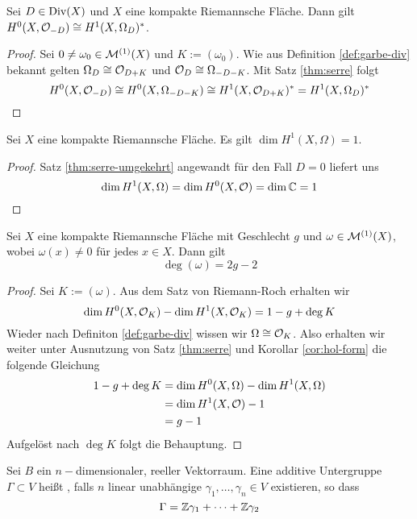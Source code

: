 \begin{thm}
  \label{thm:serre-umgekehrt}
  Sei $D \in \operatorname{Div}(X)$ und $X$ eine kompakte Riemannsche Fläche. Dann
  gilt $H^0(X, \mathcal{O}_{-D}) \cong H^1(X, \Omega_D)^\ast$.
\end{thm}

\begin{proof}
  Sei $0 \neq \omega_0 \in \mathcal{M}^{(1)}(X)$ und $K := (\omega_0)$. Wie
  aus Definition \ref{def:garbe-div} bekannt gelten $\Omega_D \cong
  \mathcal{O}_{D+K}$ und $\mathcal{O}_D \cong \Omega_{-D-K}$. Mit Satz
  \ref{thm:serre} folgt
  \[
  H^0(X, \mathcal{O}_{-D}) \cong H^0(X, \Omega_{-D-K}) \cong H^1(X,
  \mathcal{O}_{D+K})^\ast = H^1(X, \Omega_D)^\ast
  \]
\end{proof}

\begin{cor}
  \label{cor:hol-form}
  Sei $X$ eine kompakte Riemannsche Fläche. Es gilt $\dim H^1(X,
  \Omega) = 1$.
\end{cor}

\begin{proof}
  Satz \ref{thm:serre-umgekehrt} angewandt für den Fall $D = 0$
  liefert uns
  \[
  \dim H^1(X, \Omega) = \dim H^0(X, \mathcal{O}) = \dim \mathbb{C} = 1
  \]
\end{proof}

\begin{thm}
  \label{thm:deg-geschlecht}
  Sei $X$ eine kompakte Riemannsche Fläche mit Geschlecht $g$ und $\omega
  \in \mathcal{M}^{(1)}(X)$, wobei $\omega(x) \neq 0$ für jedes $x \in
  X$. Dann gilt
  \[
  \deg(\omega) = 2g - 2
  \]
\end{thm}

\begin{proof}
  Sei $K := (\omega)$. Aus dem Satz von Riemann-Roch erhalten wir
  \[
  \dim H^0(X, \mathcal{O}_K) - \dim H^1(X, \mathcal{O}_K) = 1 - g + \deg K
  \]
  Wieder nach Definiton \ref{def:garbe-div} wissen wir $\Omega \cong
  \mathcal{O}_K$. Also erhalten wir weiter unter Ausnutzung von Satz
  \ref{thm:serre} und Korollar \ref{cor:hol-form} die folgende Gleichung
  \begin{align*}
    1 - g+ \deg K & = \dim H^0(X, \Omega) - \dim H^1(X, \Omega) \\
    & = \dim H^1(X, \mathcal{O}) - 1 \\
    & = g - 1
  \end{align*}
  Aufgelöst nach $\deg K$ folgt die Behauptung.
\end{proof}

\begin{defin}
  \label{defin:gitter}
  Sei $B$ ein $n-$dimensionaler, reeller Vektorraum. Eine additive
  Untergruppe $\Gamma \subset V$ heißt , falls $n$ linear
  unabhängige $\gamma_1, \dots, \gamma_n \in V$ existieren, so dass
  \[
  \Gamma = \mathbb{Z} \gamma_1 + \dots + \mathbb{Z} \gamma_2
  \]
\end{defin}

